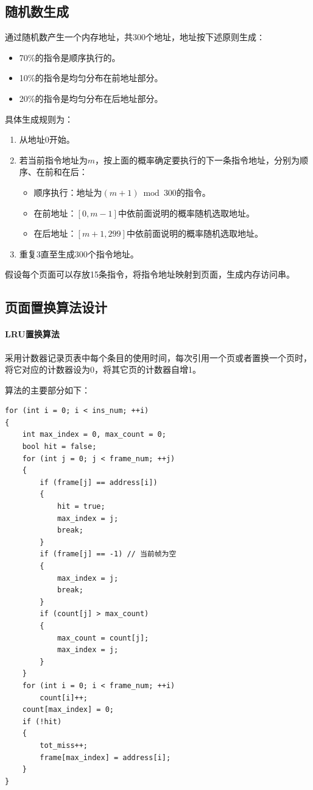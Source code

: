 \documentclass[lang=cn,11pt,a4paper,cite=authornum]{paper}
\begin{document}
\subsection{随机数生成}

通过随机数产生一个内存地址，共300个地址，地址按下述原则生成∶

\begin{itemize}
    \item 70\%的指令是顺序执行的。
    \item 10\%的指令是均匀分布在前地址部分。
    \item 20\%的指令是均匀分布在后地址部分。
\end{itemize}

具体生成规则为：

\begin{enumerate}
    \item 从地址0开始。
    \item 若当前指令地址为$m$，按上面的概率确定要执行的下一条指令地址，分别为顺序、在前和在后：
    \begin{itemize}
        \item 顺序执行：地址为$(m+1)\bmod 300$的指令。
        \item 在前地址：$[0,m-1]$中依前面说明的概率随机选取地址。
        \item 在后地址：$[m+1, 299]$中依前面说明的概率随机选取地址。
    \end{itemize}
    \item 重复3直至生成$300$个指令地址。
\end{enumerate}

假设每个页面可以存放15条指令，将指令地址映射到页面，生成内存访问串。

\subsection{页面置换算法设计}

\paragraph{LRU置换算法}

采用计数器记录页表中每个条目的使用时间，每次引用一个页或者置换一个页时，将它对应的计数器设为0，将其它页的计数器自增1。

算法的主要部分如下：

\begin{code}
\begin{verbatim}
for (int i = 0; i < ins_num; ++i)
{
    int max_index = 0, max_count = 0;
    bool hit = false;
    for (int j = 0; j < frame_num; ++j)
    {
        if (frame[j] == address[i])
        {
            hit = true;
            max_index = j;
            break;
        }
        if (frame[j] == -1) // 当前帧为空
        {
            max_index = j;
            break;
        }
        if (count[j] > max_count)
        {
            max_count = count[j];
            max_index = j;
        }
    }
    for (int i = 0; i < frame_num; ++i)
        count[i]++;
    count[max_index] = 0;
    if (!hit)
    {
        tot_miss++;
        frame[max_index] = address[i];
    }
}
\end{verbatim}
\end{code}
\end{document}
